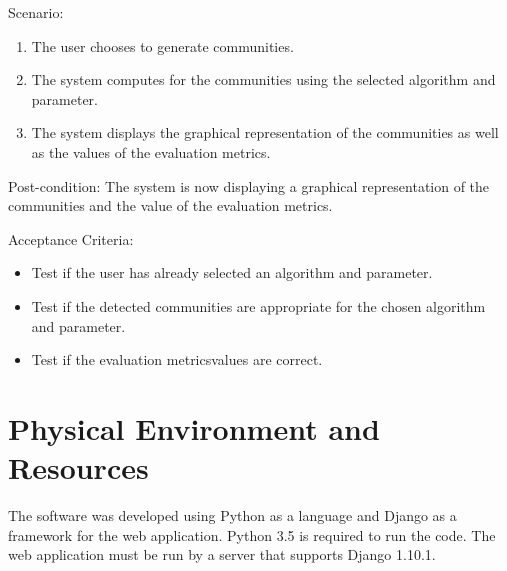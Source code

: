 Scenario:
\begin{enumerate}
	\item The user chooses to generate communities.
	\item The system computes for the communities using the selected algorithm and parameter.
	\item The system displays the graphical representation of the communities as well as the values of the evaluation metrics.
\end{enumerate}


Post-condition: The system is now displaying a graphical representation of the communities and the value of the evaluation
metrics.


Acceptance Criteria:
\begin{itemize}
	\item Test if the user has already selected an algorithm and parameter.
	\item Test if the detected communities are appropriate for the chosen algorithm and parameter.
	\item Test if the evaluation metrics\vtick values are correct.
\end{itemize}


\section{Physical Environment and Resources}
The software was developed using Python as a language and Django as a framework for the web application. Python 3.5 is required to run the code. The web application must be run by a server that supports Django 1.10.1. 




